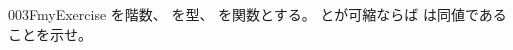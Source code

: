 \documentclass[index]{subfiles}
\begin{document}
\begin{myBlock}{003F}{myExercise}
  を階数、
  を型、
  を関数とする。
  とが可縮ならば
  は同値であることを示せ。
\end{myBlock}
\end{document}
